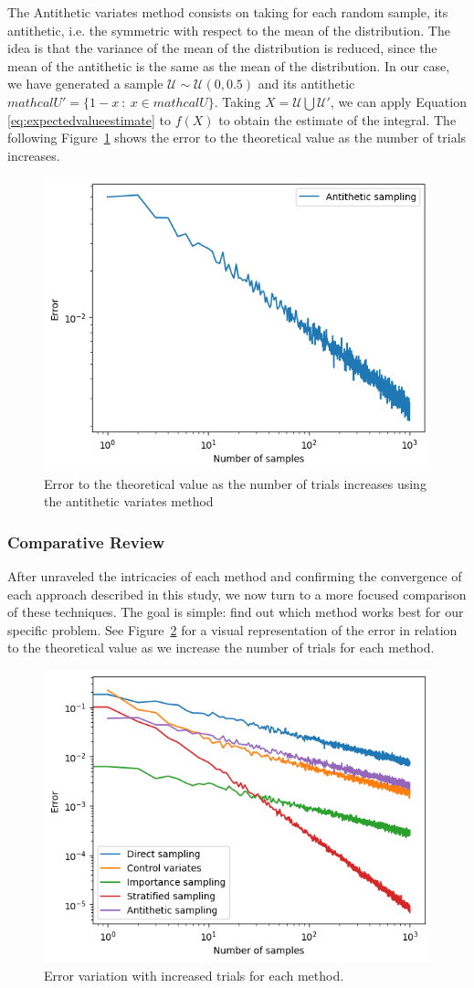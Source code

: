 \documentclass{article}
\begin{document}
The Antithetic variates method consists on taking for each random sample, its antithetic, i.e. the symmetric with respect to the mean of the distribution. The idea is that the variance of the mean of the distribution is reduced, since the mean of the antithetic is the same as the mean of the distribution. In our case, we have generated a sample \(\mathcal{U} \sim \mathcal{U}(0,0.5)\) and its antithetic \(mathcal{U}' = \{1 - x \ : \ x \in mathcal{U}\}\). Taking \(X = \mathcal{U} \bigcup \mathcal{U}' \), we can apply Equation \eqref{eq:expectedvalueestimate} to \(f(X)\) to obtain the estimate of the integral. The following Figure~\ref{fig:antitheticvariates} shows the error to the theoretical value as the number of trials increases.

\begin{figure}[H]
	\centering
	\includegraphics[width=0.5\linewidth]{./Figures/VarianceReduction/antithetic.png}
	\caption{Error to the theoretical value as the number of trials increases using the antithetic variates method}
	\label{fig:antitheticvariates}
\end{figure}

\subsubsection{Comparative Review}

After unraveled the intricacies of each method and confirming the convergence of each approach described in this study, we now turn to a more focused comparison of these techniques. The goal is simple: find out which method works best for our specific problem. See Figure~\ref{fig:comparisonvariancereduction} for a visual representation of the error in relation to the theoretical value as we increase the number of trials for each method.

\begin{figure}[H]
\centering
\includegraphics[width=0.5\linewidth]{./Figures/VarianceReduction/comparison.png}
\caption{Error variation with increased trials for each method.}
\label{fig:comparisonvariancereduction}
\end{figure}
\end{document}
